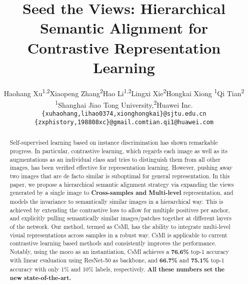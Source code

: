 \documentclass[10pt,twocolumn,letterpaper]{article}
\begin{document}
\title{Seed the Views: Hierarchical Semantic Alignment for Contrastive Representation Learning}

\author{
Haohang Xu\textsuperscript{1,2}\quad  Xiaopeng Zhang\textsuperscript{2}\quad Hao Li\textsuperscript{1,2}\quad Lingxi Xie\textsuperscript{2}\quad Hongkai Xiong \textsuperscript{1}\quad Qi Tian\textsuperscript{2}\\
\textsuperscript{1}Shanghai Jiao Tong University,\quad\textsuperscript{2}Huawei Inc.\\
\small\texttt{\{xuhaohang,lihao0374,xionghongkai\}@sjtu.edu.cn}\\\small\texttt{\{zxphistory,198808xc\}@gmail.com}\quad\small\texttt{tian.qi1@huawei.com}
}

\maketitle


\begin{abstract}
   Self-supervised learning based on instance discrimination has shown remarkable progress. In particular, contrastive learning, which regards each image as well as its augmentations as an individual class and tries to distinguish them from all other images, has been verified effective for representation learning. However, pushing away two images that are de facto similar is suboptimal for general representation. In this paper, we propose a hierarchical semantic alignment strategy via expanding the views generated by a single image to \textbf{Cross-samples and Multi-level} representation, and models the invariance to semantically similar images in a hierarchical way. This is achieved by extending the contrastive loss to allow for multiple positives per anchor, and explicitly pulling semantically similar images/patches together at different layers of the network. Our method, termed as CsMl, has the ability to integrate multi-level visual representations across samples in a robust way. CsMl is applicable to current contrastive learning based methods and consistently improves the performance. Notably, using the moco as an instantiation, CsMl achieves a \textbf{76.6\% }top-1 accuracy with linear evaluation using ResNet-50 as backbone, and \textbf{66.7\%} and \textbf{75.1\%} top-1 accuracy with only 1\% and 10\% labels, respectively. \textbf{All these numbers set the new state-of-the-art.}
\end{abstract}
\end{document}
